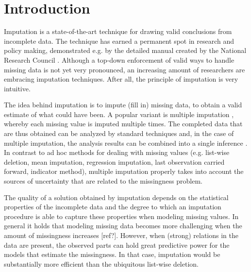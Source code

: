 \documentclass[bimj,fleqn]{w-art}
\theoremstyle{plain}
\theoremstyle{definition}
\begin{document}






\section{Introduction}

Imputation is a state-of-the-art technique for drawing valid conclusions from incomplete data. The technique has earned a permanent spot in research and policy making, demonstrated e.g. by the detailed manual created by the National Research Council \citep*{little2012prevention}. Although a top-down enforcement of valid ways to handle missing data is not yet very pronounced, an increasing amount of researchers are embracing imputation techniques. After all, the principle of imputation is very intuitive.

The idea behind imputation is to impute (fill in) missing data, to obtain a valid estimate of what could have been. A popular variant is multiple imputation \citep{rubi76}, whereby each missing value is imputed multiple times. The completed data that are thus obtained can be analyzed by standard techniques and, in the case of multiple imputation, the analysis results can be combined into a single inference \citep[using Rubin's rules][]{rubi87}. In contrast to ad hoc methods for dealing with missing values (e.g. list-wise deletion, mean imputation, regression imputation, last observation carried forward, indicator method), multiple imputation properly takes into account the sources of uncertainty that are related to the missingness problem. 

The quality of a solution obtained by imputation depends on the statistical properties of the incomplete data and the degree to which an imputation procedure is able to capture these properties when modeling missing values. In general it holds that modeling missing data becomes more challenging when the amount of missingness increases [ref?]. However, when (strong) relations in the data are present, the observed parts can hold great predictive power for the models that estimate the missingness. In that case, imputation would be substantially more efficient than the ubiquitous list-wise deletion.
\end{document}
